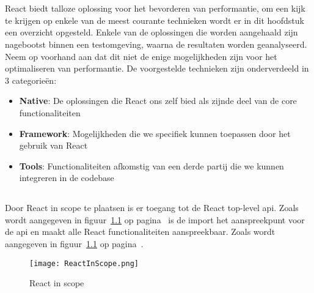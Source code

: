 \chapter{}
\label{ch:praktischePerformantie}


React biedt talloze oplossing voor het bevorderen van performantie, om een kijk te krijgen op enkele van de meest courante technieken wordt er in dit hoofdstuk een overzicht opgesteld. Enkele van de oplossingen die worden aangehaald zijn nagebootst binnen een testomgeving, waarna de resultaten worden geanalyseerd. Neem op voorhand aan dat dit niet de enige mogelijkheden zijn voor het optimaliseren van performantie. De voorgestelde technieken zijn onderverdeeld in 3 categorieën: \\

\begin{itemize}[label={}]
    \item \textbf{Native}:
    De oplossingen die React ons zelf bied als zijnde deel van de core functionaliteiten \newline
    \item \textbf{Framework}:
    Mogelijkheden die we specifiek kunnen toepassen door het gebruik van React  \newline
    \item \textbf{Tools}:
    Functionaliteiten afkomstig van een derde partij die we kunnen integreren in de codebase
\end{itemize}

\section{}
\label{sec:nativeOplossingen}

Door React in scope te plaatsen is er toegang tot de React top-level \gls{api}. Zoals wordt aangegeven in figuur~\ref{fig:reactImport} op pagina~\pageref{fig:reactImport} is de import het aanspreekpunt voor de \gls{api} en maakt alle React functionaliteiten aanspreekbaar. Zoals wordt aangegeven in figuur~\ref{fig:reactImport} op pagina~\pageref{fig:reactImport}.

\begin{figure}[H]
    \texttt{[image: ReactInScope.png]}
    \caption{React in scope}
    \label{fig:reactImport}
\end{figure}

